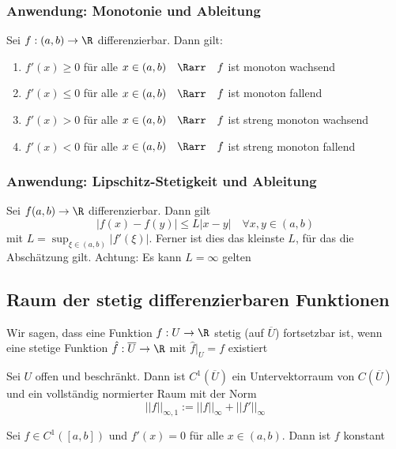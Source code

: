 		\subsubsection{Anwendung: Monotonie und Ableitung}
			\begin{Satz} [ ]
				Sei $f: (a, b)\to\R$ differenzierbar. Dann gilt:
				\begin{enumerate}
					\item $f'(x)\geq 0$ für alle $x\in(a, b) \quad \Rarr \quad f$ ist monoton wachsend
					\item $f'(x)\leq 0$ für alle $x\in(a, b) \quad \Rarr \quad f$ ist monoton fallend
					\item $f'(x) > 0$ für alle $x\in(a, b) \quad \Rarr \quad f$ ist streng monoton wachsend
					\item $f'(x) < 0$ für alle $x\in(a, b) \quad \Rarr \quad f$ ist streng monoton fallend
				\end{enumerate}
			\end{Satz}
		\subsubsection{Anwendung: Lipschitz-Stetigkeit und Ableitung}
			\begin{Satz} [ ]
				Sei $f(a, b)\to\R$ differenzierbar. Dann gilt
				$$
					|f(x)-f(y)|\leq L|x-y| \quad \forall x, y\in(a, b)
				$$
				mit $L=\sup_{\xi\in(a, b)}|f'(\xi)|$. Ferner ist dies das kleinste $L$, für das die Abschätzung gilt. Achtung: Es kann $L=\infty$ gelten
			\end{Satz}
	\subsection{Raum der stetig differenzierbaren Funktionen}
		\begin{Definition} [ Fortsetzbar]
			Wir sagen, dass eine Funktion $f: U\to\R$ stetig (auf $\overline U$) fortsetzbar ist, wenn eine stetige Funktion $\hat{f}: \overline{U}\to\R$ mit $\hat{f}|_U=f$ existiert
 		\end{Definition}
 		\begin{Satz} [ ]
 			Sei $U$ offen und beschränkt. Dann ist $C^1(\overline{U})$ ein Untervektorraum von $C(\overline{U})$ und ein vollständig normierter Raum mit der Norm
 			$$
 				||f||_{\infty, 1}:=||f||_\infty + ||f'||_\infty
 			$$
 		\end{Satz}
 		\begin{Satz} [ ]
 			Sei $f\in C^1([a, b])$ und $f'(x)= 0$ für alle $x\in(a, b)$. Dann ist $f$ konstant
 		\end{Satz}
